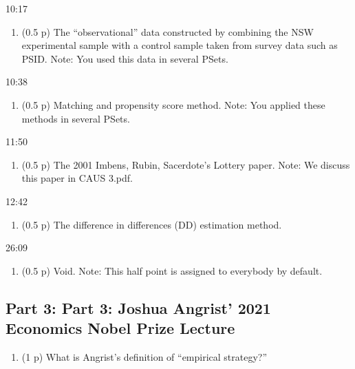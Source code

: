 \documentclass[
]{article}
\providecommand{\tightlist}{%
  \setlength{\itemsep}{0pt}\setlength{\parskip}{0pt}}
\begin{document}
10:17

\begin{enumerate}
\def\labelenumi{\arabic{enumi}.}
\setcounter{enumi}{12}
\tightlist
\item
  (0.5 p) The ``observational'' data constructed by combining the NSW
  experimental sample with a control sample taken from survey data such
  as PSID. Note: You used this data in several PSets.
\end{enumerate}

10:38

\begin{enumerate}
\def\labelenumi{\arabic{enumi}.}
\setcounter{enumi}{13}
\tightlist
\item
  (0.5 p) Matching and propensity score method. Note: You applied these
  methods in several PSets.
\end{enumerate}

11:50

\begin{enumerate}
\def\labelenumi{\arabic{enumi}.}
\setcounter{enumi}{14}
\tightlist
\item
  (0.5 p) The 2001 Imbens, Rubin, Sacerdote's Lottery paper. Note: We
  discuss this paper in CAUS 3.pdf.
\end{enumerate}

12:42

\begin{enumerate}
\def\labelenumi{\arabic{enumi}.}
\setcounter{enumi}{15}
\tightlist
\item
  (0.5 p) The difference in differences (DD) estimation method.
\end{enumerate}

26:09

\begin{enumerate}
\def\labelenumi{\arabic{enumi}.}
\setcounter{enumi}{16}
\tightlist
\item
  (0.5 p) Void. Note: This half point is assigned to everybody by
  default.
\end{enumerate}

\hypertarget{part-3-part-3-joshua-angrist-2021-economics-nobel-prize-lecture}{%
\subsection{Part 3: Part 3: Joshua Angrist' 2021 Economics Nobel Prize
Lecture}\label{part-3-part-3-joshua-angrist-2021-economics-nobel-prize-lecture}}

\begin{enumerate}
\def\labelenumi{\arabic{enumi}.}
\setcounter{enumi}{17}
\tightlist
\item
  (1 p) What is Angrist's definition of ``empirical strategy?''
\end{enumerate}
\end{document}
